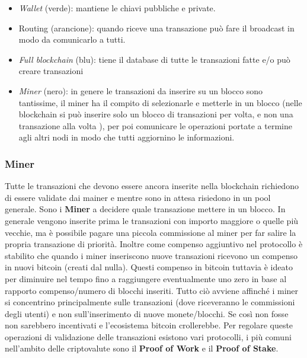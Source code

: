 \begin{itemize}
    \item \textit{Wallet} (verde): mantiene le chiavi pubbliche e private.
    \item Routing (arancione): quando riceve una transazione può fare il
          broadcast in modo da comunicarlo a tutti.
    \item \textit{Full blockchain} (blu): tiene il database di tutte le transazioni fatte
          e/o può creare transazioni
    \item \textit{Miner} (nero): in genere le transazioni da inserire su un blocco sono
          tantissime, il miner ha il compito di selezionarle e metterle in un
          blocco (nelle blockchain si può inserire solo un blocco di transazioni
          per volta, e non una transazione alla volta ), per poi comunicare le
          operazioni portate a termine agli altri nodi in modo che tutti
          aggiornino le informazioni.
\end{itemize}

\subsubsection{Miner}

Tutte le transazioni che devono essere ancora inserite nella blockchain
richiedono di essere validate dai mainer e mentre sono in attesa risiedono in un
pool generale. Sono i \textbf{Miner} a decidere quale transazione mettere in un
blocco. In generale vengono inserite prima le transazioni con importo maggiore o
quelle più vecchie, ma è possibile pagare una piccola commissione al miner per
far salire la propria transazione di priorità. Inoltre come compenso aggiuntivo
nel protocollo è stabilito che quando i miner inseriscono nuove transazioni
ricevono un compenso in nuovi bitcoin (creati dal nulla). Questi compenso in
bitcoin tuttavia è ideato per diminuire nel tempo fino a raggiungere
eventualmente uno zero in base al rapporto compenso/numero di blocchi inseriti.
Tutto ciò avviene affinché i miner si concentrino principalmente sulle
transazioni (dove riceveranno le commissioni degli utenti) e non
sull'inserimento di nuove monete/blocchi. Se così non fosse non sarebbero
incentivati e l'ecosistema bitcoin crollerebbe.
Per regolare queste operazioni di validazione delle transazioni esistono vari
protocolli, i più comuni nell'ambito delle criptovalute sono il \textbf{Proof of
    Work} e il \textbf{Proof of Stake}.

